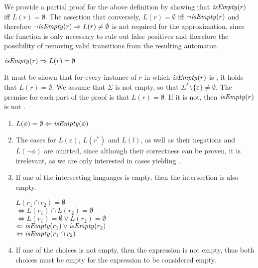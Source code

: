 We provide a partial proof for the above definition by showing that
$\mathit{isEmpty}(r)$ iff $L(r) = \emptyset$. The assertion that conversely, $L(r) =
\emptyset$ iff $\neg\mathit{isEmpty}(r)$ and therefore $\neg\mathit{isEmpty}(r) \Rightarrow L(r)
\neq \emptyset$ is not required for the approximation, since the function is
only necessary to rule out false positives and therefore the possibility of
removing valid transitions from the resulting automaton.

\begin{lem}
   $\mathit{isEmpty}(r) \Rightarrow L(r) = \emptyset$

   \proof
   It must be shown that for every instance of $r$ in which $\mathit{isEmpty}(r)$ is
   \true, it holds that $L(r) = \emptyset$. We assume that $\Sigma$ is not empty,
   so that $\Sigma^* \setminus \{\varepsilon\} \neq \emptyset$. The premise for
   each part of the proof is that $L(r) = \emptyset$. If it is not, then
   $\mathit{isEmpty}(r)$ is not \true.

   \needspace{3cm}
   \begin{enumerate}[label=\textbf{(\arabic*)}]
      \item
         $L(\phi) = \emptyset \Leftarrow \mathit{isEmpty}(\phi)$

      \item
         The cases for $L(\varepsilon)$, $L(r^*)$ and $L(l)$, as well as their
         negations and $L(\neg \phi)$ are omitted, since although their
         correctness can be proven, it is irrelevant, as we are only interested
         in cases yielding \true.

      \item
         If one of the intersecting languages is empty, then the intersection is
         also empty.

         $L(r_1 \cap r_2) = \emptyset$ \\
         $\Leftrightarrow L(r_1) \cap L(r_2) = \emptyset$ \\
         $\Leftrightarrow L(r_1) = \emptyset \vee L(r_2) = \emptyset$ \\
         $\Leftarrow \mathit{isEmpty}(r_1) \vee \mathit{isEmpty}(r_2)$ \\
         $\Leftrightarrow \mathit{isEmpty}(r_1 \cap r_2)$

      \item
         If one of the choices is not empty, then the expression is not empty,
         thus both choices must be empty for the expression to be considered
         empty.


\end{enumerate}
\end{lem}
